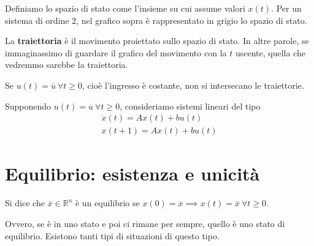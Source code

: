 \begin{figure}[htpb]
\end{figure}\FloatBarrier

Definiamo lo spazio di stato come l'insieme su cui assume valori $x(t)$. Per un sistema di ordine $2$, nel grafico sopra è rappresentato in grigio lo spazio di stato.

La \textbf{traiettoria} è il movimento proiettato sullo spazio di stato. In altre parole, se immaginassimo di guardare il grafico del movimento con la $t$ uscente, quella che vedremmo sarebbe la traiettoria.

Se $u(t) =\overline{u} \ \forall t\geq 0$, cioè l'ingresso è costante, non si intersecano le traiettorie.

Supponendo $u(t) =\overline{u} \ \forall t\geq 0$, consideriamo sistemi lineari del tipo
\begin{gather*}
	\dot{x} (t)=Ax(t)+bu(t)\\
	x(t+1)=Ax(t)+bu(t)
\end{gather*}

\section{Equilibrio: esistenza e unicità}

\begin{defn}
	Si dice che $\overline{x} \in \mathbb{R}^n$ è un equilibrio se $x(0) =\overline{x} \implies x(t) =\overline{x} \ \forall t\geq 0$.
\end{defn}
Ovvero, se è in uno stato e poi ci rimane per sempre, quello è uno stato di equilibrio. Esistono tanti tipi di situazioni di questo tipo.


